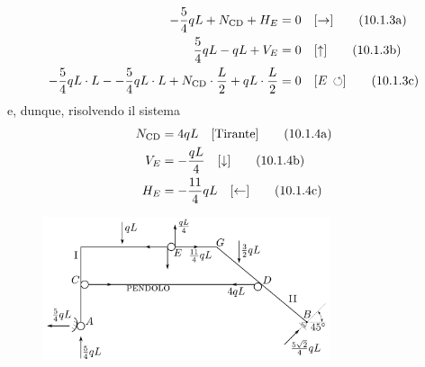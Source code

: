 \begin{subequations}
\begin{align}
-\frac{5}{4}qL + N_{\textup{CD}} + H_{E} &= 0 \quad [\rightarrow] \label{equazione10-1-3a} \tag{10.1.3a} \\
\frac{5}{4}qL - qL + V_{E} &= 0 \quad [\uparrow] \label{equazione10-1-3b} \tag{10.1.3b} \\ 
-\frac{5}{4}qL\cdot L - -\frac{5}{4}qL \cdot L + N_{\textup{CD}}\cdot \frac{L}{2} + qL \cdot \frac{L}{2} &= 0 \quad [E\, \circlearrowleft] \label{equazione10-1-3c} \tag{10.1.3c}
\end{align}
\end{subequations}
e, dunque, risolvendo il sistema
\begin{subequations}
\begin{align}
N_{\textup{CD}} &= 4qL \quad [\text{Tirante}] \label{equazione10-1-4a} \tag{10.1.4a} \\
V_{E} &= -\frac{qL}{4} \quad [\downarrow] \label{equazione10-1-4b} \tag{10.1.4b} \\ 
H_{E} &= -\frac{11}{4}qL \quad [\leftarrow] \label{equazione10-1-4c} \tag{10.1.4c}
\end{align}
\end{subequations}
\renewcommand{\thefigure}{10.1~-~4}
\begin{figure}[ht]
\centering
\includegraphics[width=0.75\textwidth]{Immagini/Parte_10/Esercizio10_1_1/Esercizio10_1_4.pdf}
\caption{}
\label{Esercizio10-1-4}
\end{figure}
